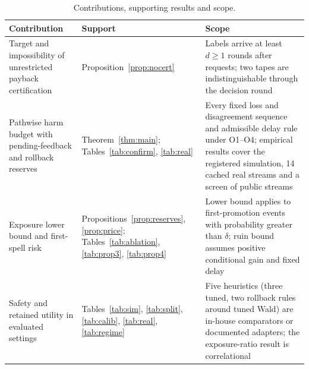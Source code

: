 \documentclass[10pt]{article}
\theoremstyle{plain}
\theoremstyle{definition}
\begin{document}
\label{app:claims}
\begin{table}[!htbp]
\caption{Contributions, supporting results and scope.}\label{tab:claims}
\centering\small
\begin{tabular}{@{}>{\raggedright\arraybackslash}p{4.5cm} >{\raggedright\arraybackslash}p{4.8cm} >{\raggedright\arraybackslash}p{5.6cm}@{}}
\toprule
Contribution & Support & Scope \\
\midrule
Target and impossibility of unrestricted payback certification & Proposition~\ref{prop:nocert} & Labels arrive at least $d\ge1$ rounds after requests; two tapes are indistinguishable through the decision round \\
Pathwise harm budget with pending-feedback and rollback reserves & Theorem~\ref{thm:main}; Tables~\ref{tab:confirm}, \ref{tab:real} & Every fixed loss and disagreement sequence and admissible delay rule under O1--O4; empirical results cover the registered simulation, 14 cached real streams and a screen of \ScreenPool{} public streams \\
Exposure lower bound and first-spell risk & Propositions~\ref{prop:reserves}, \ref{prop:price}; Tables~\ref{tab:ablation}, \ref{tab:prop3}, \ref{tab:prop4} & Lower bound applies to first-promotion events with probability greater than $\delta$; ruin bound assumes positive conditional gain and fixed delay \\
Safety and retained utility in evaluated settings & Tables~\ref{tab:sim}, \ref{tab:split}, \ref{tab:calib}, \ref{tab:real}, \ref{tab:regime} & Five heuristics (three tuned, two rollback rules around tuned Wald) are in-house comparators or documented adapters; the exposure-ratio result is correlational \\
\bottomrule
\end{tabular}
\end{table}
\end{document}
